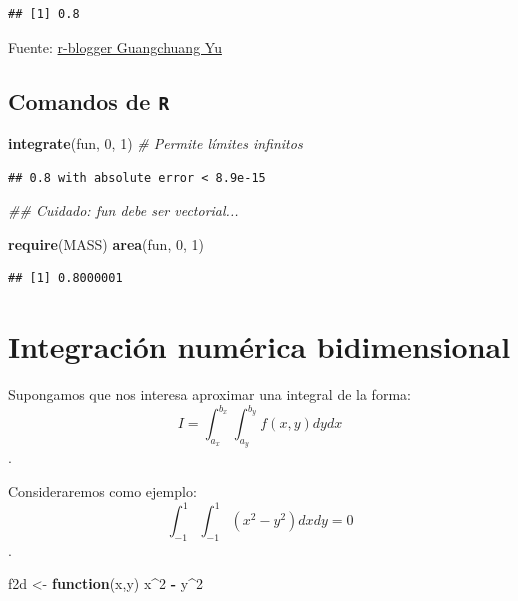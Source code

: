 \documentclass[
]{book}
\newenvironment{Shaded}{\begin{snugshade}}{\end{snugshade}}
\newcommand{\CommentTok}[1]{\textcolor[rgb]{0.56,0.35,0.01}{\textit{#1}}}
\newcommand{\ControlFlowTok}[1]{\textcolor[rgb]{0.13,0.29,0.53}{\textbf{#1}}}
\newcommand{\DecValTok}[1]{\textcolor[rgb]{0.00,0.00,0.81}{#1}}
\newcommand{\KeywordTok}[1]{\textcolor[rgb]{0.13,0.29,0.53}{\textbf{#1}}}
\newcommand{\NormalTok}[1]{#1}
\newcommand{\OperatorTok}[1]{\textcolor[rgb]{0.81,0.36,0.00}{\textbf{#1}}}
\newcommand{\StringTok}[1]{\textcolor[rgb]{0.31,0.60,0.02}{#1}}
\theoremstyle{break}
\theoremstyle{definition}
\theoremstyle{definition}
\theoremstyle{definition}
\theoremstyle{remark}
\begin{document}
\begin{verbatim}
## [1] 0.8
\end{verbatim}

Fuente: \href{https://www.r-bloggers.com/one-dimensional-integrals}{r-blogger Guangchuang Yu}

\hypertarget{comandos-de-r}{%
\subsection{\texorpdfstring{Comandos de \texttt{R}}{Comandos de R}}\label{comandos-de-r}}

\begin{Shaded}
\begin{Highlighting}[]
\KeywordTok{integrate}\NormalTok{(fun, }\DecValTok{0}\NormalTok{, }\DecValTok{1}\NormalTok{)   }\CommentTok{# Permite límites infinitos  }
\end{Highlighting}
\end{Shaded}

\begin{verbatim}
## 0.8 with absolute error < 8.9e-15
\end{verbatim}

\begin{Shaded}
\begin{Highlighting}[]
\CommentTok{## Cuidado: fun debe ser vectorial...}

\KeywordTok{require}\NormalTok{(MASS)}
\KeywordTok{area}\NormalTok{(fun, }\DecValTok{0}\NormalTok{, }\DecValTok{1}\NormalTok{)}
\end{Highlighting}
\end{Shaded}

\begin{verbatim}
## [1] 0.8000001
\end{verbatim}

\hypertarget{integraciuxf3n-numuxe9rica-bidimensional}{%
\section{Integración numérica bidimensional}\label{integraciuxf3n-numuxe9rica-bidimensional}}

Supongamos que nos interesa aproximar una integral de la forma:
\[I=\int_{a_x}^{b_x}\int_{a_y}^{b_y}f(x, y)dy dx\].

Consideraremos como ejemplo:
\[\int_{-1}^{1} \int_{-1}^{1} \left( x^2 - y^2 \right) dx dy = 0\].

\begin{Shaded}
\begin{Highlighting}[]
\NormalTok{f2d <-}\StringTok{ }\ControlFlowTok{function}\NormalTok{(x,y) x}\OperatorTok{^}\DecValTok{2} \OperatorTok{-}\StringTok{ }\NormalTok{y}\OperatorTok{^}\DecValTok{2}
\end{Highlighting}
\end{Shaded}
\end{document}

